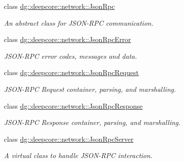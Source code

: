 \begin{DoxyCompactItemize}
class \hyperlink{classdg_1_1deepcore_1_1network_1_1_json_rpc}{dg\+::deepcore\+::network\+::\+Json\+Rpc}
\begin{DoxyCompactList}\small\item\em An abstract class for J\+S\+O\+N-\/\+R\+PC communication. \end{DoxyCompactList}\item 
class \hyperlink{classdg_1_1deepcore_1_1network_1_1_json_rpc_error}{dg\+::deepcore\+::network\+::\+Json\+Rpc\+Error}
\begin{DoxyCompactList}\small\item\em J\+S\+O\+N-\/\+R\+PC error codes, messages and data. \end{DoxyCompactList}\item 
class \hyperlink{classdg_1_1deepcore_1_1network_1_1_json_rpc_request}{dg\+::deepcore\+::network\+::\+Json\+Rpc\+Request}
\begin{DoxyCompactList}\small\item\em J\+S\+O\+N-\/\+R\+PC Request container, parsing, and marshalling. \end{DoxyCompactList}\item 
class \hyperlink{classdg_1_1deepcore_1_1network_1_1_json_rpc_response}{dg\+::deepcore\+::network\+::\+Json\+Rpc\+Response}
\begin{DoxyCompactList}\small\item\em J\+S\+O\+N-\/\+R\+PC Response container, parsing, and marshalling. \end{DoxyCompactList}\item 
class \hyperlink{classdg_1_1deepcore_1_1network_1_1_json_rpc_server}{dg\+::deepcore\+::network\+::\+Json\+Rpc\+Server}
\begin{DoxyCompactList}\small\item\em A virtual class to handle J\+S\+O\+N-\/\+R\+PC interaction. \end{DoxyCompactList}\end{DoxyCompactItemize}
